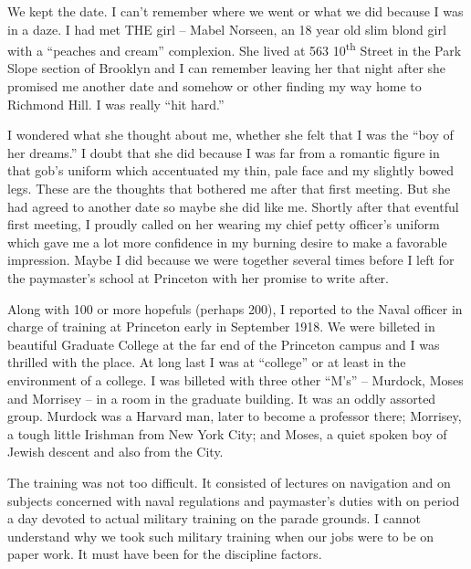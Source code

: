 \documentclass[12pt]{book}              %
\begin{document}
We kept the date. I can't remember where we went or what we did because I was in a daze. I had met THE girl -- Mabel Norseen, an 18 year old slim blond girl with a ``peaches and cream'' complexion. She lived at 563 10\textsuperscript{th} Street in the Park Slope section of Brooklyn and I can remember leaving her that night after she promised me another date and somehow or other finding my way home to Richmond Hill. I was really ``hit hard.''

I wondered what she thought about me, whether she felt that I was the ``boy of her dreams.'' I doubt that she did because I was far from a romantic figure in that gob's uniform which accentuated my thin, pale face and my slightly bowed legs. These are the thoughts that bothered me after that first meeting. But she had agreed to another date so maybe she did like me. Shortly after that eventful first meeting, I proudly called on her wearing my chief petty officer's uniform which gave me a lot more confidence in my burning desire to make a favorable impression. Maybe I did because we were together several times before I left for the paymaster's school at Princeton with her promise to write after. 

Along with 100 or more hopefuls (perhaps 200), I reported to the Naval officer in charge of training at Princeton early in September 1918. We were billeted in beautiful Graduate College at the far end of the Princeton campus and I was thrilled with the place. At long last I was at ``college'' or at least in the environment of a college. I was billeted with three other ``M's'' -- Murdock, Moses and Morrisey -- in a room in the graduate building. It was an oddly assorted group. Murdock was a Harvard man, later to become a professor there; Morrisey, a tough little Irishman from New York City; and Moses, a quiet spoken boy of Jewish descent and also from the City. 

The training was not too difficult. It consisted of lectures on navigation and on subjects concerned with naval regulations and paymaster's duties with on period a day devoted to actual military training on the parade grounds. I cannot understand why we took such military training when our jobs were to be on paper work. It must have been for the discipline factors. 
\end{document}
